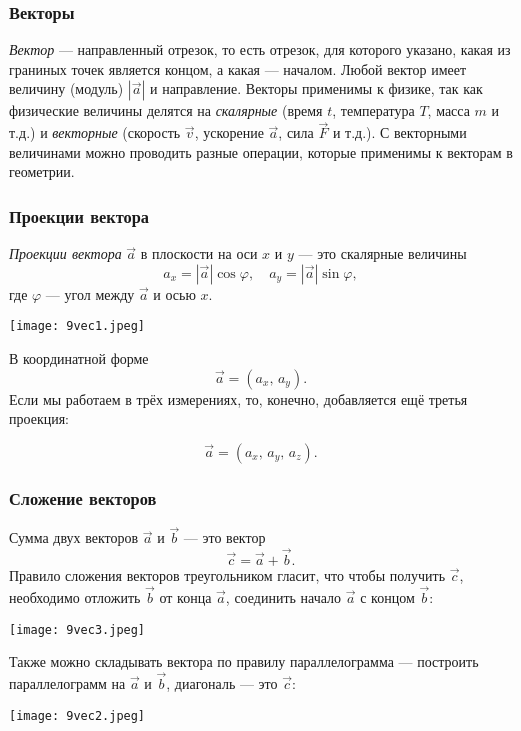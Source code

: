 \documentclass[12pt, a4paper]{article}%
\begin{document}
\subsubsection*{Векторы}
\textit{Вектор} --- направленный отрезок, то есть отрезок, для которого указано, какая из граниных точек 
является концом, а какая --- началом. Любой вектор имеет величину (модуль) $|\vec a|$ и направление. Векторы применимы к физике, так как физические величины делятся на 
\textit{скалярные} (время $t$, температура $T$, масса $m$ и т.д.) и \textit{векторные} (скорость $\vec{v}$, 
ускорение $\vec{a}$, сила $\vec{F}$ и т.д.). С векторными величинами можно проводить разные операции, 
которые применимы к векторам в геометрии.

\subsubsection*{Проекции вектора}
\textit{Проекции вектора} $\vec a$ в плоскости на оси $x$ и $y$ — это скалярные величины
\[
a_x = |\vec a|\cos\varphi,\quad a_y = |\vec a|\sin\varphi,
\]
где $\varphi$ — угол между $\vec a$ и осью $x$.

\begin{center}
\texttt{[image: 9vec1.jpeg]}
\label{fig:mpr}
\end{center}

В координатной форме
\[
\vec a = (a_x,\,a_y).
\]
Если мы работаем в трёх измерениях, то, конечно, добавляется ещё третья проекция:

\[
\vec a = (a_x,\,a_y,\,a_z).
\]

\subsubsection*{Сложение векторов}
Сумма двух векторов $\vec a$ и $\vec b$ — это вектор
\[
\vec c = \vec a + \vec b.
\]
Правило сложения векторов треугольником гласит, что чтобы получить $\vec c$, необходимо
отложить $\vec b$ от конца $\vec a$, соединить начало $\vec a$ с концом $\vec b$:

\begin{center}
\texttt{[image: 9vec3.jpeg]}
\label{fig:mpr}
\end{center}


Также можно складывать вектора по правилу параллелограмма --- построить параллелограмм на 
$\vec a$ и $\vec b$, диагональ — это $\vec c$:

\begin{center}
\texttt{[image: 9vec2.jpeg]}
\label{fig:mpr}
\end{center}
\end{document}
